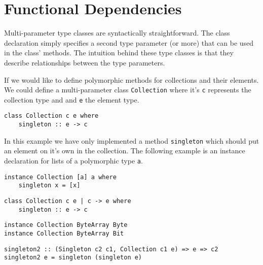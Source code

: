 \section{Functional Dependencies}
Multi-parameter type classes are syntactically straightforward. The class
declaration simply specifies a second type parameter (or more) that can be used
in the class' methods. The intuition behind these type classes is that they
describe relationships between the type parameters.

If we would like to define polymorphic methods for collections and their
elements. We could define a multi-parameter class \texttt{Collection} where it's
\texttt{c} represents the collection type and and \texttt{e} the element type.
\begin{verbatim}
class Collection c e where
    singleton :: e -> c
\end{verbatim}
In this example we have only implemented a method \texttt{singleton} which
should put an element on it's own in the collection.
The following example is an instance declaration for lists of a polymorphic type
\texttt{a}.
\begin{verbatim}
instance Collection [a] a where
    singleton x = [x]
\end{verbatim}


\begin{verbatim}
class Collection c e | c -> e where
    singleton :: e -> c
\end{verbatim}

\begin{verbatim}
instance Collection ByteArray Byte
instance Collection ByteArray Bit
\end{verbatim}

\begin{verbatim}
singleton2 :: (Singleton c2 c1, Collection c1 e) => e => c2
singleton2 e = singleton (singleton e)
\end{verbatim}
